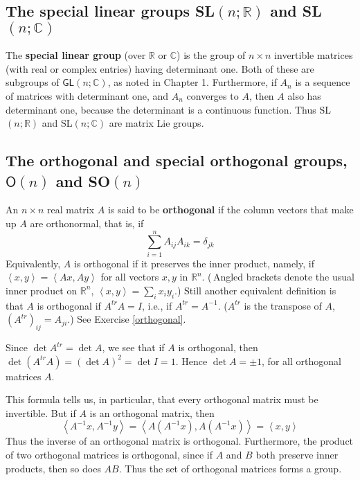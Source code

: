\documentclass{amsbook}
\theoremstyle{plain}
\numberwithin{equation}{chapter}
\numberwithin{theorem}{chapter}
\begin{document}
\subsection{The special linear groups \textsf{SL}$\left(  n;\mathbb{R}\right)
$ and \textsf{SL}$\left(  n;\mathbb{C}\right)  $}

The \textbf{special linear group} (over $\mathbb{R}$ or $\mathbb{C}$) is the
group of $n\times n$ invertible matrices (with real or complex entries) having
determinant one. Both of these are subgroups of $\mathsf{GL}(n;\mathbb{C})$,
as noted in Chapter 1. Furthermore, if $A_{n}$ is a sequence of matrices with
determinant one, and $A_{n}$ converges to $A$, then $A$ also has determinant
one, because the determinant is a continuous function. Thus \textsf{SL}%
$\left(  n;\mathbb{R}\right)  $ and \textsf{SL}$\left(  n;\mathbb{C}\right)  $
are matrix Lie groups.

\subsection{The orthogonal and special orthogonal groups, $\mathsf{O}(n)$ and
\textsf{SO}$(n)$}

An $n\times n$ real matrix $A$ is said to be \textbf{orthogonal} if the column
vectors that make up $A$ are orthonormal, that is, if
\[
\sum_{i=1}^{n}A_{ij}A_{ik}=\delta_{jk}%
\]
Equivalently, $A$ is orthogonal if it preserves the inner product, namely, if
$\left\langle x,y\right\rangle =\left\langle Ax,Ay\right\rangle $ for all
vectors $x,y$ in $\mathbb{R}^{n}$. ($\,$Angled brackets denote the usual inner
product on $\mathbb{R}^{n}$, $\left\langle x,y\right\rangle =\sum_{i}%
x_{i}y_{i}$.) Still another equivalent definition is that $A$ is orthogonal if
$A^{tr}A=I$, i.e., if $A^{tr}=A^{-1}$. ($A^{tr}$ is the transpose of $A$,
$\left(  A^{tr}\right)  _{ij}=A_{ji}$.) See Exercise \ref{orthogonal}.

Since $\det A^{tr}=\det A$, we see that if $A$ is orthogonal, then
$\det(A^{tr}A)=\left(  \det A\right)  ^{2}=\det I=1$. Hence $\det A=\pm1$, for
all orthogonal matrices $A$.

This formula tells us, in particular, that every orthogonal matrix must be
invertible. But if $A$ is an orthogonal matrix, then
\[
\left\langle A^{-1}x,A^{-1}y\right\rangle =\left\langle A\left(
A^{-1}x\right)  ,A\left(  A^{-1}x\right)  \right\rangle =\left\langle
x,y\right\rangle
\]
Thus the inverse of an orthogonal matrix is orthogonal. Furthermore, the
product of two orthogonal matrices is orthogonal, since if $A$ and $B$ both
preserve inner products, then so does $AB$. Thus the set of orthogonal
matrices forms a group.
\end{document}
